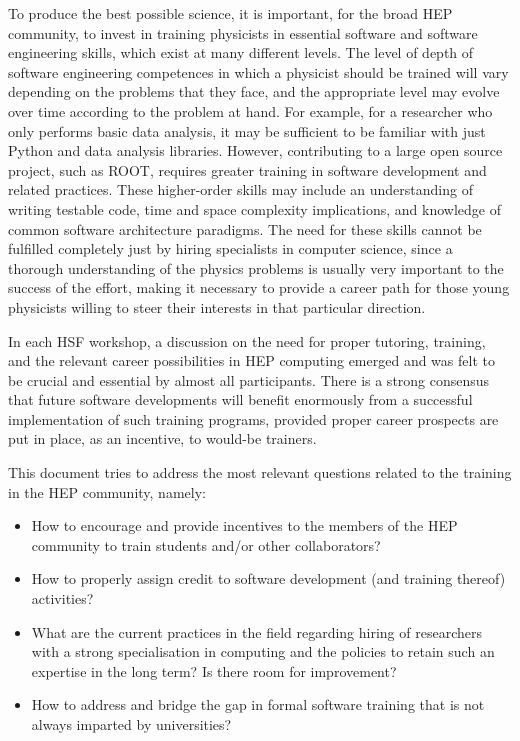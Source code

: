 To produce the best possible science, it is important, for the broad HEP community, to invest in training physicists in essential software and software engineering skills, which exist at many different levels. The level of depth of software engineering competences in which a physicist should be trained will vary depending on the problems that they face, and the appropriate level may evolve over time according to the problem at hand. For example, for a researcher who only performs basic data analysis, it may be sufficient to be familiar with just Python and data analysis libraries. However, contributing to a large open source project, such as ROOT, requires greater training in software development and related practices. These higher-order skills may include an understanding of writing testable code, time and space complexity implications, and knowledge of common software architecture paradigms. The need for these skills cannot be fulfilled completely just by hiring specialists in computer science, since a thorough understanding of the physics problems is usually very important to the success of the effort, making it necessary to provide a career path for those young physicists willing to steer their interests in that particular direction.

In each HSF workshop, a discussion on the need for proper tutoring, training, and the relevant career possibilities in HEP computing emerged and was felt to be crucial and essential by almost all participants. There is a strong consensus that future software developments will benefit enormously from a successful implementation of such training programs, provided proper career prospects are put in place, as an incentive, to would-be trainers.

This document tries to address the most relevant questions related to the training in the HEP community, namely:
\begin{itemize}
    \item How to encourage and provide incentives to the members of the HEP community to train students and/or other collaborators?
    \item How to properly assign credit to software development (and training thereof) activities?
    \item What are the current practices in the field regarding hiring of researchers with a strong specialisation in computing and the policies to retain such an expertise in the long term? Is there room for improvement?
    \item How to address and bridge the gap in formal software training that is not always imparted by universities?
\end{itemize}

